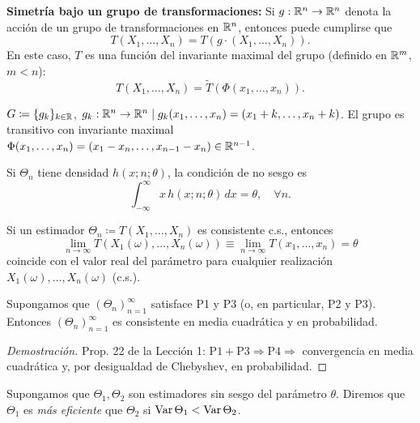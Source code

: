\textcolor{azulresalt}{
\noindent \textbf{Simetría bajo un grupo de transformaciones:} Si $g : \mathbb{R}^n \to \mathbb{R}^n$ denota la acción de un grupo de transformaciones en $\mathbb{R}^n$, entonces puede cumplirse que
\[
  T(X_1, \dots, X_n) = T(g \cdot (X_1, \dots, X_n)).
\]
En este caso, $T$ es una función del invariante maximal del grupo (definido en $\mathbb{R}^m$, $m < n$):
\[
  T(X_1, \dots, X_n) = \tilde{T}(\Phi(x_1, \dots, x_n)).
\]
\begin{ejemplo}
$G \coloneqq \{g_k\}_{k \in \mathbb{R}}$, $g_k : \mathbb{R}^n \to \mathbb{R}^n \mid g_k(x_1, \dots, x_n) = (x_1 + k, \dots, x_n + k)$. El grupo es transitivo con invariante maximal $\Phi(x_1, \dots, x_n) = (x_1 - x_n, \dots, x_{n-1} - x_n) \in \mathbb{R}^{n-1}$.
\end{ejemplo}}

\begin{observacion}[4]
Si $\Theta_n$ tiene densidad $h(x; n; \theta)$, la condición de no sesgo es
\[
  \int_{-\infty}^\infty x\,h(x; n; \theta)\,dx = \theta, \quad \forall n.
\]
\end{observacion}

\begin{observacion}[5]
Si un estimador $\Theta_n \coloneqq T(X_1, \dots, X_n)$ es consistente c.s., entonces
\[
  \lim_{n\to\infty} T(X_1(\omega), \dots, X_n(\omega)) \equiv \lim_{n\to\infty} T(x_1, \dots, x_n) = \theta
\]
coincide con el valor real del parámetro para cualquier realización $X_1(\omega), \dots, X_n(\omega)$ (c.s.).
\end{observacion}

\begin{proposicion}[2]
Supongamos que $(\Theta_n)_{n=1}^\infty$ satisface P1 y P3 (o, en particular, P2 y P3). Entonces $(\Theta_n)_{n=1}^\infty$ es consistente en media cuadrática y en probabilidad.
\end{proposicion}
\textcolor{azulresalt}{\begin{proof}[Demostración]
Prop. 22 de la Lección 1: $\text{P1} + \text{P3} \Rightarrow \text{P4} \Rightarrow$ convergencia en media cuadrática y, por desigualdad de Chebyshev, en probabilidad.
\end{proof}}

\begin{definicion}[7]
Supongamos que $\Theta_1, \Theta_2$ son estimadores sin sesgo del parámetro $\theta$. Diremos que $\Theta_1$ es \emph{más eficiente} que $\Theta_2$ si $\operatorname{Var}\Theta_1 < \operatorname{Var}\Theta_2$.
\end{definicion}

